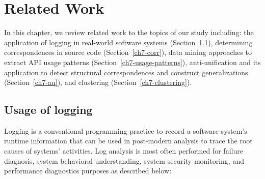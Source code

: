 \chapter{Related Work}  \label{rw}
In this chapter, we review related work to the topics of our study including: the application of logging in real-world software systems (Section~\ref{logging}), determining correspondences in source code (Section~\ref{ch7-corr}), data mining approaches to extract API usage patterns (Section~\ref{ch7-usage-patterns}), anti-unification and its application to detect structural correspondences and construct generalizations (Section~\ref{ch7-au}), and clustering (Section~\ref{ch7-clustering}).
\section{Usage of logging}  \label{logging}
Logging is a conventional programming practice to record a software system's runtime information that can be used in post-modern analysis to trace the root causes of systems' activities. Log analysis is most often performed for failure diagnosis, system behavioral understanding, system security monitoring, and performance diagnostics purposes as described below:
